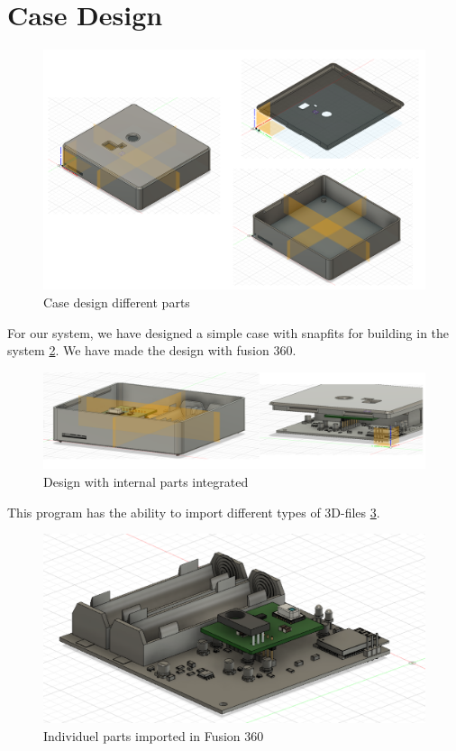 \documentclass[11pt,a4paper]{article}
\begin{document}
\section{Case Design}
\begin{figure}[H]
	\centering
	\includegraphics[width=1.0\linewidth]{case_design.png}
	\caption{Case design different parts}
	\label{fig:case_design}
\end{figure}
For our system, we have designed a simple case with snapfits for building in the system \ref{fig:snapfits_total}. We have made the design with fusion 360. 
\begin{figure}[H]
	\centering
	\includegraphics[width=1.0\linewidth]{snapfits_total.png}
	\caption{Design with internal parts integrated}
	\label{fig:snapfits_total}
\end{figure}
This program has the ability to import different types of 3D-files \ref{fig:electronic_system}. 
\begin{figure}[H]
	\centering
	\includegraphics[width=1.0\linewidth]{electronic_system.png}
	\caption{Individuel parts imported in Fusion 360}
	\label{fig:electronic_system}
\end{figure}
\end{document}
